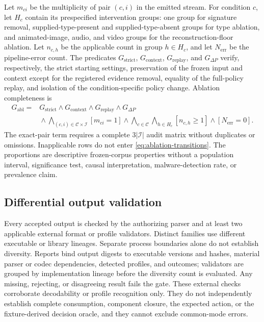Let \(m_{ci}\) be the multiplicity of pair \((c,i)\) in the emitted stream.
For condition \(c\), let \(H_c\) contain its prespecified intervention groups:
one group for signature removal, supplied-type-present and supplied-type-absent
groups for type ablation, and animated-image, audio, and video groups for the
reconstruction-floor ablation. Let \(n_{c,h}\) be the applicable count in group
\(h\in H_c\), and let \(N_{\mathrm{err}}\) be the pipeline-error count. The predicates
\(G_{\mathrm{strict}}\), \(G_{\mathrm{context}}\),
\(G_{\mathrm{replay}}\), and \(G_{\Delta P}\) verify, respectively, the strict
starting settings, preservation of the frozen input and context except for the
registered evidence removal, equality of the full-policy replay, and isolation
of the condition-specific policy change. Ablation completeness is
\begin{equation}
 \begin{aligned}
 G_{\mathrm{abl}}={}&G_{\mathrm{strict}}\land G_{\mathrm{context}}
 \land G_{\mathrm{replay}}\land G_{\Delta P}\\
 &{}\land
 \bigwedge_{(c,i)\in\mathcal{C}\times\mathcal{I}}[m_{ci}=1]
 \land \bigwedge_{c\in\mathcal{C}}\bigwedge_{h\in H_c}[n_{c,h}\geq1]
 \land [N_{\mathrm{err}}=0].
 \end{aligned}
 \label{eq:ablation-gate}
\end{equation}
The exact-pair term requires a complete \(3|\mathcal{I}|\) audit matrix without
duplicates or omissions. Inapplicable rows do not enter
\cref{eq:ablation-transitions}. The proportions are descriptive frozen-corpus
properties without a population interval, significance test, causal
interpretation, malware-detection rate, or prevalence claim.

\subsection{Differential output validation}
\label{subsec:differential-validation}

Every accepted output is checked by the authorizing parser and at least two
applicable external format or profile validators. Distinct families use
different executable or library lineages. Separate process boundaries alone do
not establish diversity. Reports bind output digests to executable versions and
hashes, material parser or codec dependencies, detected profiles, and outcomes;
validators are grouped by implementation lineage before the diversity count is
evaluated. Any missing, rejecting, or disagreeing result
fails the gate. These external checks corroborate decodability or profile
recognition only. They do not independently establish complete consumption,
component closure, the expected action, or the fixture-derived decision oracle,
and they cannot exclude common-mode errors.

